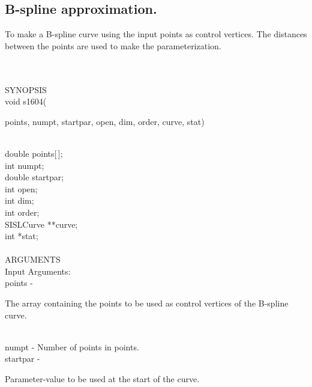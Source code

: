 \subsection{B-spline approximation.}
\begin{minipg1}
        To make a B-spline curve using the input points as control vertices. The
        distances between the points are used to make the parameterization.
\end{minipg1} \\ \\
SYNOPSIS\\
        \>void s1604(\begin{minipg3}
                {\fov points}, {\fov numpt}, {\fov startpar}, {\fov open}, {\fov dim}, {\fov order}, {\fov curve}, {\fov stat})
                \end{minipg3}\\[0.3ex]
                \>\>    double  \>      {\fov points}[\,];\\
                \>\>    int     \>      {\fov numpt};\\
                \>\>    double  \>      {\fov startpar};\\
                \>\>    int     \>      {\fov open};\\
                \>\>    int     \>      {\fov dim};\\
                \>\>    int     \>      {\fov order};\\
                \>\>    SISLCurve       \>      **{\fov curve};\\
                \>\>    int     \>      *{\fov stat};\\
\\
ARGUMENTS\\
        \>Input Arguments:\\
        \>\>    {\fov points}   \> - \> \begin{minipg2}
                                The array containing the points to be used as
                                control vertices of the B-spline curve.
                                \end{minipg2}\\[0.3ex]
        \>\>    {\fov numpt}    \> - \> Number of points in points.\\
        \>\>    {\fov startpar}\> - \>  \begin{minipg2}
                                Parameter-value to be used at the
                                start of the curve.
                                \end{minipg2}\\
